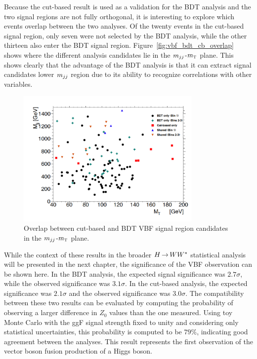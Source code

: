 Because the cut-based result is used as a validation for the BDT analysis and the two signal regions are not fully orthogonal, it is interesting to explore which events overlap between the two analyses. Of the twenty events in the cut-based signal region, only seven were not selected by the BDT analysis, while the other thirteen also enter the BDT signal region. Figure~\ref{fig:vbf_bdt_cb_overlap} shows where the different analysis candidates lie in the $m_{jj}$-$m_{\textrm{\footnotesize\sc t}}$ plane. This shows clearly that the advantage of the BDT analysis is that it can extract signal candidates lower $m_{jj}$ region due to its ability to recognize correlations with other variables. 

\begin{figure}[h!]
  \centering
  \captionsetup{justification=centering}
  \includegraphics[width=0.8\textwidth]{figures/OverlapFig}
  \caption{Overlap between cut-based and BDT VBF signal region candidates in the $m_{jj}$-$m_{\textrm{\footnotesize\sc t}}$ plane.}
  \label{fig:vbf_bdt_cb_overlay}
\end{figure}

While the context of these results in the broader $H{\,{\rightarrow}\,}WW^\ast$ statistical analysis will be presented in the next chapter, the significance of the VBF observation can be shown here. In the BDT analysis, the expected signal significance was $2.7\sigma$, while the observed significance was $3.1\sigma$. In the cut-based analysis, the expected significance was $2.1\sigma$ and the observed significance was $3.0\sigma$. The compatibility between these two results can be evaluated by computing the probability of observing a larger difference in $Z_0$ values than the one measured. Using toy Monte Carlo with the ggF signal strength fixed to unity and considering only statistical uncertainties, this probability is computed to be $79\%$, indicating good agreement between the analyses. This result represents the first observation of the vector boson fusion production of a Higgs boson. 

